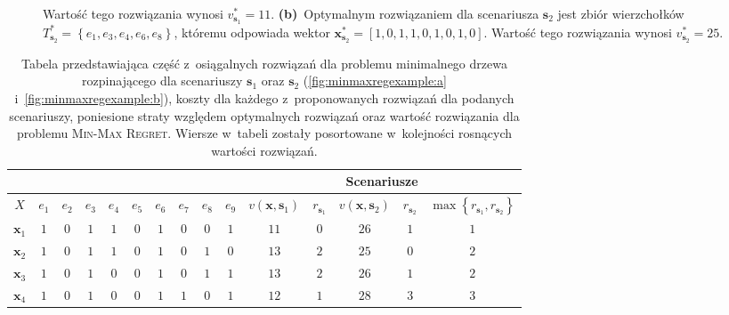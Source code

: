 \begin{figure}[!htbp]
{		Wartość tego rozwiązania wynosi $v^{\ast}_{\textbf{s}_{1}} = 11$.
		\textbf{(b)}~Optymalnym rozwiązaniem dla scenariusza $\textbf{s}_{2}$ jest zbiór wierzchołków $T^{\ast}_{\textbf{s}_{2}} = \left\{ e_{1}, e_{3}, e_{4}, e_{6}, e_{8} \right\}$, któremu odpowiada wektor $\textbf{x}^{\ast}_{\textbf{s}_{2}} = \left[ 1, 0, 1, 1, 0, 1, 0, 1, 0 \right]$.
		Wartość tego rozwiązania wynosi $v^{\ast}_{\textbf{s}_{2}} = 25$.
	}
	\label{fig:minmaxregexample}
\end{figure}

\begin{table}[!htbp]
	\caption{
		Tabela przedstawiająca część z~osiągalnych rozwiązań dla problemu minimalnego drzewa rozpinającego dla scenariuszy $\textbf{s}_{1}$ oraz $\textbf{s}_{2}$ (\ref{fig:minmaxregexample:a} i~\ref{fig:minmaxregexample:b}), koszty dla każdego z~proponowanych rozwiązań dla podanych scenariuszy, poniesione straty względem optymalnych rozwiązań oraz wartość rozwiązania dla problemu \textsc{Min-Max Regret}.
		Wiersze w~tabeli zostały posortowane w~kolejności rosnących wartości rozwiązań.
	}
	\label{tab:minmaxregexample2}
	\centering
	\begin{tabular}{ccccccccccccccc}
		\cline{11-15}
		\multicolumn{2}{c}{}       &         &         &         &         &         &         &         &         & \multicolumn{5}{c}{Scenariusze}                                                                                                                                                                                             \\ \hline
		$X$              & $e_{1}$ & $e_{2}$ & $e_{3}$ & $e_{4}$ & $e_{5}$ & $e_{6}$ & $e_{7}$ & $e_{8}$ & $e_{9}$ & $v \left( \textbf{x}, \textbf{s}_{1} \right) $ & $r_{\textbf{s}_{1}}$  & $v \left( \textbf{x}, \textbf{s}_{2} \right) $ &  $r_{\textbf{s}_{2}}$ & $\max \left\{ r_{\textbf{s}_{1}}, r_{\textbf{s}_{2}} \right\} $ \\ \hline
		$\textbf{x}_{1}$ & $1$     & $0$     & $1$     & $1$     & $0$     & $1$     & $0$     & $0$	&	$1$	&	$11$	&	$0$	&	$26$	&	$1$	&	$1$	\\
		$\textbf{x}_{2}$ & $1$     & $0$     & $1$     & $1$     & $0$     & $1$     & $0$     & $1$	&	$0$	&	$13$	&	$2$	&	$25$	&	$0$	&	$2$	\\
		$\textbf{x}_{3}$ & $1$     & $0$     & $1$     & $0$     & $0$     & $1$     & $0$     & $1$	&	$1$	&	$13$	&	$2$	&	$26$	&	$1$	&	$2$	\\
		$\textbf{x}_{4}$ & $1$     & $0$     & $1$     & $0$     & $0$     & $1$     & $1$     & $0$	&	$1$	&	$12$	&	$1$	&	$28$	&	$3$	&	$3$	\\

\end{tabular}
\end{table}
